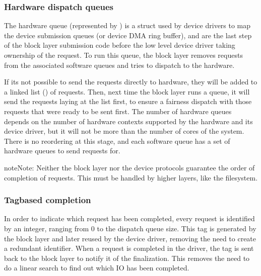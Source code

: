 \documentclass[a4paper,11pt,english]{sphinxmanual}
\begin{document}
\subsubsection{Hardware dispatch queues}
\label{\detokenize{blk-mq:hardware-dispatch-queues}}
The hardware queue (represented by {\hyperref[\detokenize{blk-mq:c.blk_mq_hw_ctx}]{}}) is a struct
used by device drivers to map the device submission queues (or device DMA ring
buffer), and are the last step of the block layer submission code before the
low level device driver taking ownership of the request. To run this queue, the
block layer removes requests from the associated software queues and tries to
dispatch to the hardware.

If it\textquotesingle{}s not possible to send the requests directly to hardware, they will be
added to a linked list () of requests. Then,
next time the block layer runs a queue, it will send the requests laying at the
 list first, to ensure a fairness dispatch with those
requests that were ready to be sent first. The number of hardware queues
depends on the number of hardware contexts supported by the hardware and its
device driver, but it will not be more than the number of cores of the system.
There is no reordering at this stage, and each software queue has a set of
hardware queues to send requests for.

\begin{sphinxadmonition}{note}{Note:}
Neither the block layer nor the device protocols guarantee
the order of completion of requests. This must be handled by
higher layers, like the filesystem.
\end{sphinxadmonition}


\subsubsection{Tag\sphinxhyphen{}based completion}
\label{\detokenize{blk-mq:tag-based-completion}}
In order to indicate which request has been completed, every request is
identified by an integer, ranging from 0 to the dispatch queue size. This tag
is generated by the block layer and later reused by the device driver, removing
the need to create a redundant identifier. When a request is completed in the
driver, the tag is sent back to the block layer to notify it of the finalization.
This removes the need to do a linear search to find out which IO has been
completed.
\end{document}
